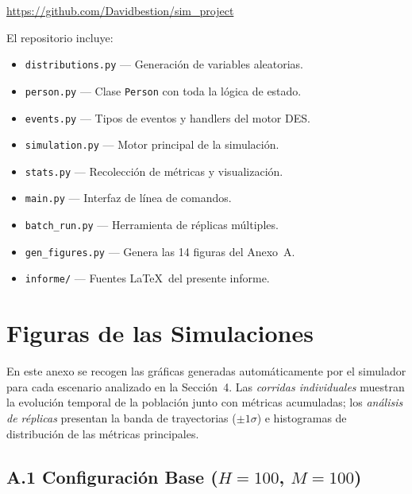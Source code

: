 \documentclass[12pt, a4paper]{article}
\newcommand{\code}[1]{\texttt{#1}}
\begin{document}
\begin{center}
  \url{https://github.com/Davidbestion/sim_project}
\end{center}

El repositorio incluye:
\begin{itemize}
  \item \code{distributions.py} — Generación de variables aleatorias.
  \item \code{person.py} — Clase \code{Person} con toda la lógica de estado.
  \item \code{events.py} — Tipos de eventos y handlers del motor DES.
  \item \code{simulation.py} — Motor principal de la simulación.
  \item \code{stats.py} — Recolección de métricas y visualización.
  \item \code{main.py} — Interfaz de línea de comandos.
  \item \code{batch\_run.py} — Herramienta de réplicas múltiples.
  \item \code{gen\_figures.py} — Genera las 14 figuras del Anexo~A.
  \item \code{informe/} — Fuentes \LaTeX\ del presente informe.
\end{itemize}

\appendix
\renewcommand{\thesection}{\Alph{section}}
\section{Figuras de las Simulaciones}

En este anexo se recogen las gráficas generadas automáticamente por el
simulador para cada escenario analizado en la Sección~4.
Las \textit{corridas individuales} muestran la evolución temporal de la
población junto con métricas acumuladas; los \textit{análisis de réplicas}
presentan la banda de trayectorias ($\pm 1\sigma$) e histogramas de
distribución de las métricas principales.

\subsection*{A.1 Configuración Base ($H=100$, $M=100$)}
\end{document}
